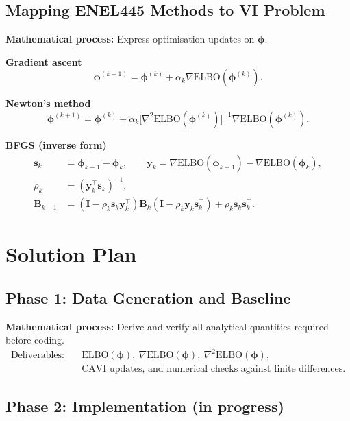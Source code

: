 \documentclass[11pt]{article}
\newcommand{\ELBO}{\mathrm{ELBO}}
\begin{document}
\subsection*{Mapping ENEL445 Methods to VI Problem}

\textbf{Mathematical process:} Express optimisation updates on $\bm\phi$.

\textbf{Gradient ascent}
\begin{equation}
\bm\phi^{(k+1)} = \bm\phi^{(k)} + \alpha_k\nabla\ELBO(\bm\phi^{(k)}).
\end{equation}

\textbf{Newton's method}
\begin{equation}
\bm\phi^{(k+1)}
= \bm\phi^{(k)} + \alpha_k\big[\nabla^2\ELBO(\bm\phi^{(k)})\big]^{-1}\nabla\ELBO(\bm\phi^{(k)}).
\end{equation}

\textbf{BFGS (inverse form)}
\begin{align}
\bm s_k &= \bm\phi_{k+1}-\bm\phi_k,
\qquad
\bm y_k = \nabla\ELBO(\bm\phi_{k+1})-\nabla\ELBO(\bm\phi_k),\\
\rho_k &= (\bm y_k^\top\bm s_k)^{-1},\\
\bm B_{k+1} &= (\bm I-\rho_k\bm s_k\bm y_k^\top)\bm B_k(\bm I-\rho_k\bm y_k\bm s_k^\top)+\rho_k\bm s_k\bm s_k^\top.
\end{align}

\section*{Solution Plan}

\subsection*{Phase 1: Data Generation and Baseline}

\textbf{Mathematical process:} Derive and verify all analytical quantities required before coding.
\begin{align}
\text{Deliverables}:
\quad &\ELBO(\bm\phi),\ \nabla\ELBO(\bm\phi),\ \nabla^2\ELBO(\bm\phi),\\
&\text{CAVI updates, and numerical checks against finite differences.}
\end{align}

\subsection*{Phase 2: Implementation (in progress)}
\end{document}
